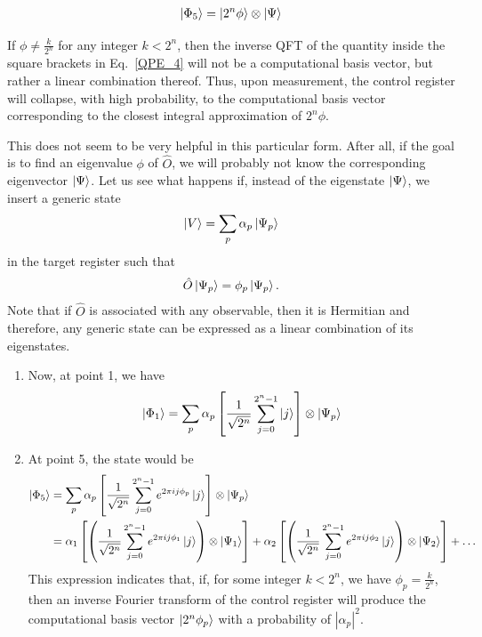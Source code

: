 \documentclass[12pt,oneside]{book}
\begin{document}
\begin{enumerate}
    \begin{align}
        \ket{\Phi_5}=\ket{2^n\phi}\otimes\ket{\Psi}
    \end{align}
    
    If $\phi \neq \frac{k}{2^n}$ for any integer $k<2^n$, then the inverse QFT of the  quantity inside the square brackets in Eq.~\ref{QPE_4} will not be a computational basis vector, but rather a linear combination thereof. Thus, upon measurement, the control register will collapse, with high probability, to the computational basis vector corresponding to the closest integral approximation of $2^n\phi$.
\end{enumerate}

This does not seem to be very helpful in this particular form. After all, if the goal is to find an eigenvalue $\phi$ of $\hat{O}$, we will probably not know the corresponding eigenvector $\ket{\Psi}$. Let us see what happens if, instead of the eigenstate $\ket{\Psi}$, we insert a generic state
\begin{align}
    \ket{V}=\sum_p \alpha_p\ket{\Psi_p}
\end{align}
in the target register such that
\begin{align}
    \hat{O}\ket{\Psi_p}=\phi_p\ket{\Psi_p}.
\end{align}
Note that if $\hat{O}$ is associated with any observable, then it is Hermitian and therefore, any generic state can be expressed as a linear combination of its eigenstates.
\begin{enumerate}
    \item Now, at point 1, we have
    \begin{align*}
        \ket{\Phi_1}=\sum_p \alpha_p \left[\frac{1}{\sqrt{2^n}}\sum_{j=0}^{2^n-1}\ket{j}\right]\otimes\ket{\Psi_p}
    \end{align*}
    \item At point 5, the state would be
    \begin{align*}
        \ket{\Phi_5} &{} =\sum_p \alpha_p \left[\frac{1}{\sqrt{2^n}} \sum_{j=0}^{2^n-1}e^{2\pi i j \phi_p}\ket{j}\right]\otimes\ket{\Psi_p}\\
        &{} = \alpha_1 \left[\left(\frac{1}{\sqrt{2^n}} \sum_{j=0}^{2^n-1}e^{2\pi i j \phi_1}\ket{j}\right)\otimes\ket{\Psi_1}\right] + \alpha_2 \left[\left(\frac{1}{\sqrt{2^n}} \sum_{j=0}^{2^n-1}e^{2\pi i j \phi_2}\ket{j}\right)\otimes\ket{\Psi_2}\right] + \hdots
    \end{align*}
    This expression indicates that, if, for some integer $k<2^n$, we have $\phi_p=\frac{k}{2^n}$, then an inverse Fourier transform of the control register will produce the computational basis vector $\ket{2^n\phi_p}$ with a probability of $|\alpha_p|^2$.
\end{enumerate}
\end{document}
